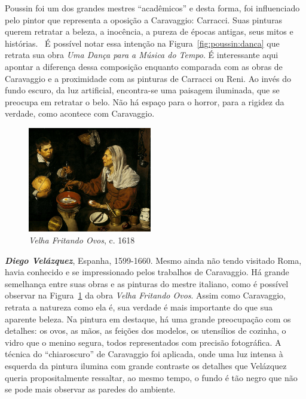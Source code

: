 Poussin foi um dos grandes mestres ``acadêmicos'' e desta forma, foi
influenciado pelo pintor que representa a oposição a Caravaggio: Carracci. Suas
pinturas querem retratar a beleza, a inocência, a pureza de épocas antigas, seus
mitos e histórias.~\cite{unglaub} É possível notar essa intenção na
Figura~\ref{fig:poussin:danca} que retrata sua obra \textit{Uma Dança para a
  Música do Tempo}. É interessante aqui apontar a diferença dessa composição
enquanto comparada com as obras de Caravaggio e a proximidade com as pinturas de
Carracci ou Reni. Ao invés do fundo escuro, da luz artificial, encontra-se uma
paisagem iluminada, que se preocupa em retratar o belo. Não há espaço para o
horror, para a rigidez da verdade, como acontece com Caravaggio.


\begin{figure}
  \begin{center}
    \includegraphics[width=0.48\textwidth]{figs/velazquez_velha.png}
  \end{center}
  \caption{\emph{Velha Fritando Ovos}, c. 1618}
  \label{fig:velazquez:velha}
\end{figure}

\textbf{\emph{Diego Velázquez}}, Espanha, 1599-1660. Mesmo ainda não tendo
visitado Roma, havia conhecido e se impressionado pelos trabalhos de
Caravaggio. Há grande semelhança entre suas obras e as pinturas do mestre
italiano, como é possível observar na Figura~\ref{fig:velazquez:velha} da obra
\textit{Velha Fritando Ovos}. Assim como Caravaggio, retrata a natureza como ela
é, sua verdade é mais importante do que sua aparente beleza. Na pintura em
destaque, há uma grande preocupação com os detalhes: os ovos, as mãos, as
feições dos modelos, os utensílios de cozinha, o vidro que o menino segura,
todos representados com precisão fotográfica. A técnica do ``chiaroscuro'' de
Caravaggio foi aplicada, onde uma luz intensa à esquerda da pintura ilumina com
grande contraste os detalhes que Velázquez queria propositalmente ressaltar, ao
mesmo tempo, o fundo é tão negro que não se pode mais observar as paredes do
ambiente.~\cite{gombrich}

